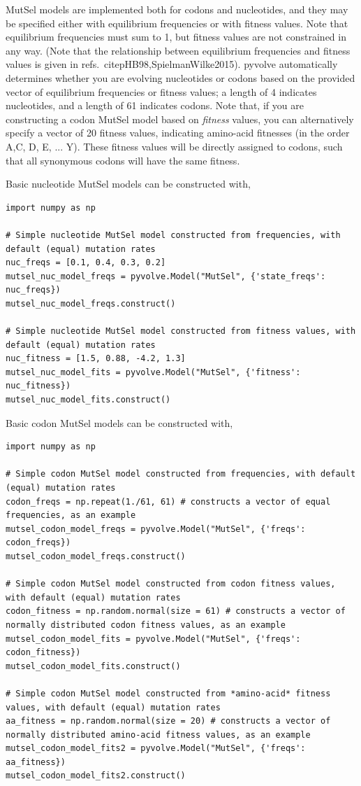 \documentclass{article}
\begin{document}
MutSel models are implemented both for codons and nucleotides, and they may be specified either with equilibrium frequencies or with fitness values. Note that equilibrium frequencies must sum to 1, but fitness values are not constrained in any way. (Note that the relationship between equilibrium frequencies and fitness values is given in refs.\ citep{HB98,SpielmanWilke2015}). pyvolve automatically determines whether you are evolving nucleotides or codons based on the provided vector of equilibrium frequencies or fitness values; a length of 4 indicates nucleotides, and a length of 61 indicates codons. Note that, if you are constructing a codon MutSel model based on \emph{fitness} values, you can alternatively specify a vector of 20 fitness values, indicating amino-acid fitnesses (in the order A,C, D, E, ... Y). These fitness values will be directly assigned to codons, such that all synonymous codons will have the same fitness.


Basic nucleotide MutSel models can be constructed with,
\begin{lstlisting}
import numpy as np

# Simple nucleotide MutSel model constructed from frequencies, with default (equal) mutation rates
nuc_freqs = [0.1, 0.4, 0.3, 0.2]
mutsel_nuc_model_freqs = pyvolve.Model("MutSel", {'state_freqs': nuc_freqs})
mutsel_nuc_model_freqs.construct()

# Simple nucleotide MutSel model constructed from fitness values, with default (equal) mutation rates
nuc_fitness = [1.5, 0.88, -4.2, 1.3]
mutsel_nuc_model_fits = pyvolve.Model("MutSel", {'fitness': nuc_fitness})
mutsel_nuc_model_fits.construct()
\end{lstlisting}

Basic codon MutSel models can be constructed with,
\begin{lstlisting}
import numpy as np

# Simple codon MutSel model constructed from frequencies, with default (equal) mutation rates
codon_freqs = np.repeat(1./61, 61) # constructs a vector of equal frequencies, as an example
mutsel_codon_model_freqs = pyvolve.Model("MutSel", {'freqs': codon_freqs})
mutsel_codon_model_freqs.construct()

# Simple codon MutSel model constructed from codon fitness values, with default (equal) mutation rates
codon_fitness = np.random.normal(size = 61) # constructs a vector of normally distributed codon fitness values, as an example
mutsel_codon_model_fits = pyvolve.Model("MutSel", {'freqs': codon_fitness})
mutsel_codon_model_fits.construct()

# Simple codon MutSel model constructed from *amino-acid* fitness values, with default (equal) mutation rates
aa_fitness = np.random.normal(size = 20) # constructs a vector of normally distributed amino-acid fitness values, as an example
mutsel_codon_model_fits2 = pyvolve.Model("MutSel", {'freqs': aa_fitness})
mutsel_codon_model_fits2.construct()

\end{lstlisting}
\end{document}
